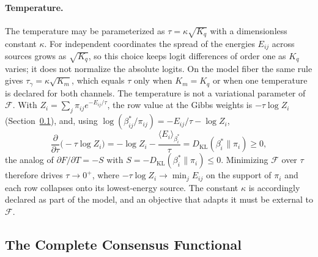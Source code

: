 \documentclass[11pt]{article}
\begin{document}
\paragraph{Temperature.} The temperature may be parameterized as $\tau = \kappa\sqrt{K_q}$ with a dimensionless constant $\kappa$. For independent coordinates the spread of the energies $E_{ij}$ across sources grows as $\sqrt{K_q}$, so this choice keeps logit differences of order one as $K_q$ varies; it does not normalize the absolute logits. On the model fiber the same rule gives $\tau_\gamma = \kappa\sqrt{K_m}$, which equals $\tau$ only when $K_m = K_q$ or when one temperature is declared for both channels. The temperature is not a variational parameter of $\mathcal{F}$. With $Z_i = \sum_j \pi_{ij} e^{-E_{ij}/\tau}$, the row value at the Gibbs weights is $-\tau \log Z_i$ (Section~\ref{sec:complete_free_energy}), and, using $\log(\beta^*_{ij}/\pi_{ij}) = -E_{ij}/\tau - \log Z_i$,
\begin{equation}
\frac{\partial}{\partial \tau}\big(-\tau \log Z_i\big) = -\log Z_i - \frac{\langle E_i \rangle_{\beta_i^*}}{\tau} = D_{\mathrm{KL}}(\beta_i^* \| \pi_i) \geq 0,
\end{equation}
the analog of $\partial F/\partial T = -S$ with $S = -D_{\mathrm{KL}}(\beta_i^* \| \pi_i) \leq 0$. Minimizing $\mathcal{F}$ over $\tau$ therefore drives $\tau \to 0^+$, where $-\tau \log Z_i \to \min_j E_{ij}$ on the support of $\pi_i$ and each row collapses onto its lowest-energy source. The constant $\kappa$ is accordingly declared as part of the model, and an objective that adapts it must be external to $\mathcal{F}$.

\subsection{The Complete Consensus Functional}
\label{sec:complete_free_energy}
\end{document}

